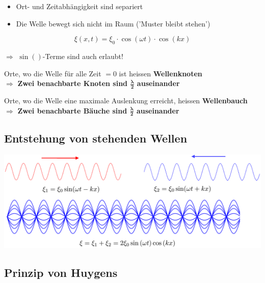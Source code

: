 \begin{itemize}
	\item Ort- und Zeitabhängigkeit sind separiert 
	\item Die Welle bewegt sich nicht im Raum ('Muster bleibt stehen') 
\end{itemize}



$$ \boxed{ \xi(x, t) = \xi_0 \cdot \cos(\omega t) \cdot \cos(k x) } $$

$\Rightarrow$ $\sin()$-Terme sind auch erlaubt!\\
\vspace{0.2cm}

Orte, wo die Welle für alle Zeit $= 0$ ist heissen \textbf{Wellenknoten} \\
$\Rightarrow$ \textbf{Zwei benachbarte Knoten sind $\boldsymbol{\frac{\lambda}{2}}$ auseinander}\\
\vspace{0.2cm}

Orte, wo die Welle eine maximale Auslenkung erreicht, heissen \textbf{Wellenbauch} \\
$\Rightarrow$ \textbf{Zwei benachbarte Bäuche sind $\boldsymbol{\frac{\lambda}{2}}$ auseinander}





\subsection{Entstehung von stehenden Wellen}

\includegraphics[width=0.9\linewidth]{Bilder/Wellen-Optik/stehende_wellen}



\subsection{Prinzip von Huygens}


